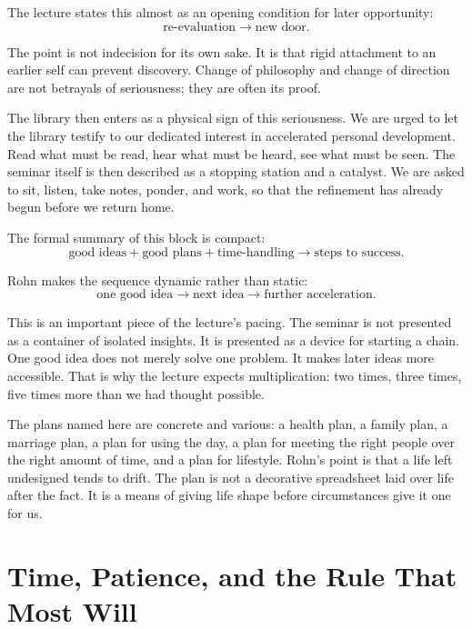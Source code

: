 The lecture states this almost as an opening condition for later opportunity:
\[
\text{re-evaluation} \rightarrow \text{new door}.
\]

The point is not indecision for its own sake. It is that rigid attachment to an earlier self can prevent discovery. Change of philosophy and change of direction are not betrayals of seriousness; they are often its proof.

The library then enters as a physical sign of this seriousness. We are urged to let the library testify to our dedicated interest in accelerated personal development. Read what must be read, hear what must be heard, see what must be seen. The seminar itself is then described as a stopping station and a catalyst. We are asked to sit, listen, take notes, ponder, and work, so that the refinement has already begun before we return home.

The formal summary of this block is compact:
\begin{equation}
\text{good ideas} + \text{good plans} + \text{time-handling} \rightarrow \text{steps to success}.
\end{equation}

Rohn makes the sequence dynamic rather than static:
\begin{equation}
\text{one good idea} \rightarrow \text{next idea} \rightarrow \text{further acceleration}.
\end{equation}

This is an important piece of the lecture's pacing. The seminar is not presented as a container of isolated insights. It is presented as a device for starting a chain. One good idea does not merely solve one problem. It makes later ideas more accessible. That is why the lecture expects multiplication: two times, three times, five times more than we had thought possible.

The plans named here are concrete and various: a health plan, a family plan, a marriage plan, a plan for using the day, a plan for meeting the right people over the right amount of time, and a plan for lifestyle. Rohn's point is that a life left undesigned tends to drift. The plan is not a decorative spreadsheet laid over life after the fact. It is a means of giving life shape before circumstances give it one for us.

\section{Time, Patience, and the Rule That Most Will}

